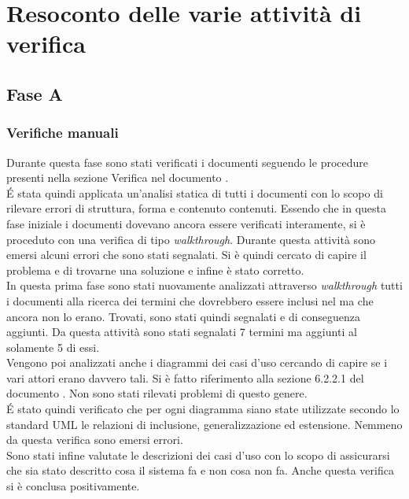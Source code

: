 \section{Resoconto delle varie attività di verifica}
		\subsection{Fase A}
			\subsubsection{Verifiche manuali}
			Durante questa fase sono stati verificati i documenti seguendo le procedure presenti nella sezione Verifica nel documento .\\
			É stata quindi applicata un'analisi  statica di tutti i documenti con lo scopo di rilevare errori di struttura, forma e contenuto contenuti. Essendo che in questa fase iniziale i documenti dovevano ancora essere verificati interamente, si è proceduto con una verifica di tipo \textit{walkthrough}. Durante questa attività sono emersi alcuni errori che sono stati segnalati. Si è quindi cercato di capire il problema e di trovarne una soluzione e infine è stato corretto.\\ %
			In questa prima fase sono stati nuovamente analizzati attraverso \textit{walkthrough} tutti i documenti alla ricerca dei termini che dovrebbero essere inclusi nel  ma che ancora non lo erano. Trovati, sono stati quindi segnalati e di conseguenza aggiunti. Da questa attività sono stati segnalati 7 termini ma aggiunti al  solamente 5 di essi.\\
			Vengono poi analizzati anche i diagrammi dei casi d'uso cercando di capire se i vari attori erano davvero tali. Si è fatto riferimento alla sezione 6.2.2.1 del documento . Non sono stati rilevati problemi di questo genere.\\
			É stato quindi verificato che per ogni diagramma siano state utilizzate secondo lo standard UML le relazioni di inclusione, generalizzazione ed estensione. Nemmeno da questa verifica sono emersi errori.\\
			Sono stati infine valutate le descrizioni dei casi d'uso con lo scopo di assicurarsi che sia stato descritto cosa il sistema fa e non cosa non fa. Anche questa verifica si è conclusa positivamente.
